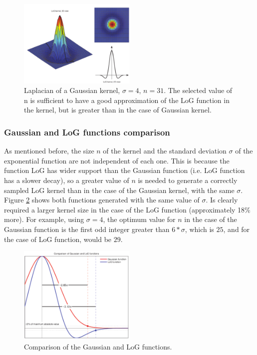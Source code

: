 \documentclass{ipol}
\numberwithin{equation}{section}
\numberwithin{table}{section}
\numberwithin{figure}{section}
\begin{document}
\begin{figure}
	\centering
	\includegraphics[width=0.5\textwidth]{kernel_log.pdf}
	\caption{Laplacian of a Gaussian kernel, $\sigma=4$, $n=31$. The selected value of n is sufficient 
to have a good approximation of the LoG function in the kernel, but is greater than in the case of 
Gaussian kernel.}
	\label{fig:log_kernel}
\end{figure}


\subsubsection{Gaussian and LoG functions comparison}

As mentioned before, the size $n$ of the kernel and the standard deviation $\sigma$ of the exponential function 
are not independent of each one. This is because the function LoG has wider support than the
Gaussian function (i.e. LoG function has a slower decay), so a greater value of $n$ is needed to 
generate a correctly sampled LoG kernel than in the case of the Gaussian kernel, with the same $\sigma$.\\

Figure \ref{fig:kernels} shows both functions generated with the same value of $\sigma$. Is clearly 
required a larger kernel size in the case of the LoG function (approximately 18\% more). For 
example, using $\sigma=4$, the optimum value for $n$ in the case of the Gaussian function is the 
first odd integer greater than $6*\sigma$, which is $25$, and for the case of LoG function, would 
be $29$.

\begin{figure}
	\centering
	\includegraphics[width=0.5\textwidth]{kernels.pdf}
	\caption{Comparison of the Gaussian and LoG functions.}
	\label{fig:kernels}
\end{figure}
\end{document}
